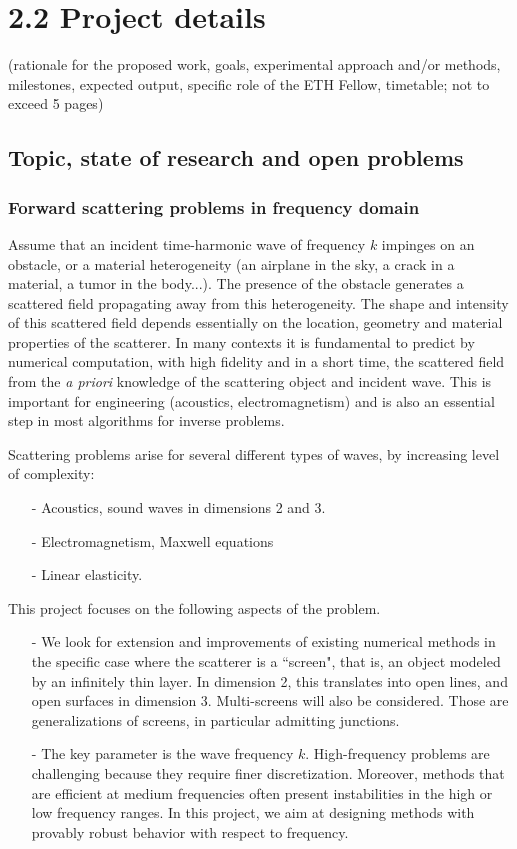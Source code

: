 \documentclass[]{article}
\begin{document}
\section*{2.2 Project details}
(rationale for the proposed work, goals, experimental approach and/or methods, milestones, expected output, specific role of the ETH Fellow, timetable; not to exceed 5 pages)

\subsection*{Topic, state of research and open problems}


\subsubsection*{Forward scattering problems in frequency domain}	

Assume that an incident time-harmonic wave of frequency $k$ impinges on an obstacle, or a material heterogeneity (an airplane in the sky, a crack in a material, a tumor in the body...). The presence of the obstacle generates a scattered field propagating away from this heterogeneity. The shape and intensity of this scattered field depends essentially on the location, geometry and material properties of the scatterer. In many contexts it is fundamental to predict by numerical computation, with high fidelity and in a short time, the scattered field from the \textit{a priori} knowledge of the scattering object and incident wave. This is important for engineering (acoustics, electromagnetism) and is also an essential step in most algorithms for inverse problems.

Scattering problems arise for several different types of waves, by increasing level of complexity:
\begin{itemize}\itemsep-.2em 
	\item[-] Acoustics, sound waves in dimensions 2 and 3.
	\item[-] Electromagnetism, Maxwell equations
	\item[-] Linear elasticity. 
\end{itemize}   

This project focuses on the following aspects of the problem.
\begin{itemize}
	\item[-] We look for extension and improvements of existing numerical methods in the specific case where the scatterer is a ``screen", that is, an object modeled by an infinitely thin layer. In dimension 2, this translates into open lines, and open surfaces in dimension 3. Multi-screens will also be considered. Those are generalizations of screens, in particular admitting junctions. 
	\item[-] The key parameter is the wave frequency $k$. High-frequency problems are challenging because they require finer discretization. Moreover, methods that are efficient at medium frequencies often present instabilities in the high or low frequency ranges. In this project, we aim at designing methods with provably robust behavior with respect to frequency. 
\end{itemize}
\end{document}
